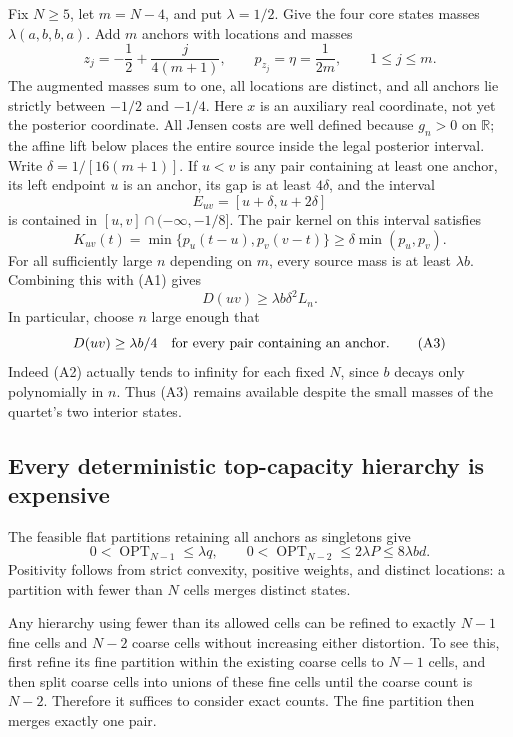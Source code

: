 Fix $N\ge5$, let $m=N-4$, and put $\lambda=1/2$. Give the four
core states masses $\lambda(a,b,b,a)$. Add $m$ anchors with locations
and masses
\[
 z_j=-\frac12+\frac{j}{4(m+1)},\qquad
 p_{z_j}=\eta=\frac1{2m},\qquad 1\le j\le m.
\]
The augmented masses sum to one, all locations are distinct, and all
anchors lie strictly between $-1/2$ and $-1/4$.
Here $x$ is an auxiliary real coordinate, not yet the posterior
coordinate. All Jensen costs are well defined because $g_n>0$ on
$\mathbb R$; the affine lift below places the entire source inside the
legal posterior interval.
Write $\delta=1/[16(m+1)]$. If $u<v$ is any pair containing at least
one anchor, its left endpoint $u$ is an anchor, its gap is at least
$4\delta$, and the interval
\[
 E_{uv}=[u+\delta,u+2\delta]
\]
is contained in $[u,v]\cap(-\infty,-1/8]$. The pair kernel on this
interval satisfies
\[
 K_{uv}(t)=\min\{p_u(t-u),p_v(v-t)\}
 \ge\delta\min(p_u,p_v).
\]
For all sufficiently large $n$ depending on $m$, every source mass is
at least $\lambda b$. Combining this with (A1) gives
\begin{equation}
 D(uv)\ge\lambda b\delta^2L_n.
 \tag{A2}
\end{equation}
In particular, choose $n$ large enough that
\begin{equation}
 D(uv)\ge\lambda b/4
 \quad\hbox{for every pair containing an anchor}.
 \tag{A3}
\end{equation}
Indeed (A2) actually tends to infinity for each fixed $N$, since $b$
decays only polynomially in $n$. Thus (A3) remains available despite
the small masses of the quartet's two interior states.

\subsection{Every deterministic top-capacity hierarchy is expensive}
The feasible flat partitions retaining all anchors as singletons give
\begin{equation}
 0<\operatorname{OPT}_{N-1}\le\lambda q,
 \qquad
 0<\operatorname{OPT}_{N-2}\le2\lambda P\le8\lambda bd.
 \tag{A4}
\end{equation}
Positivity follows from strict convexity, positive weights, and distinct
locations: a partition with fewer than $N$ cells merges distinct states.

Any hierarchy using fewer than its allowed cells can be refined to
exactly $N-1$ fine cells and $N-2$ coarse cells without increasing
either distortion. To see this, first refine its fine partition within
the existing coarse cells to $N-1$ cells, and then split coarse cells
into unions of these fine cells until the coarse count is $N-2$.
Therefore it suffices to consider exact counts. The fine partition then
merges exactly one pair.

